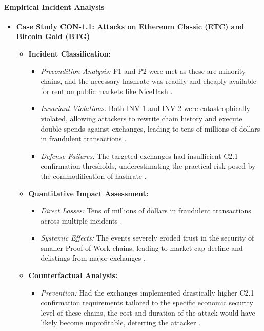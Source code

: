 \paragraph{Empirical Incident Analysis}

\begin{itemize}
    \item \textbf{Case Study CON-1.1: Attacks on Ethereum Classic (ETC) and Bitcoin Gold (BTG)}
    \begin{itemize}
        \item \textbf{Incident Classification:}
            \begin{itemize}
                \item \textit{Precondition Analysis:} P1 and P2 were met as these are minority chains, and the necessary hashrate was readily and cheaply available for rent on public markets like NiceHash \cite{Casino2019, Eyal2014}.
                \item \textit{Invariant Violations:} Both INV-1 and INV-2 were catastrophically violated, allowing attackers to rewrite chain history and execute double-spends against exchanges, leading to tens of millions of dollars in fraudulent transactions \cite{Casino2019}.
                \item \textit{Defense Failures:} The targeted exchanges had insufficient C2.1 confirmation thresholds, underestimating the practical risk posed by the commodification of hashrate \cite{Eyal2014}.
            \end{itemize}
        \item \textbf{Quantitative Impact Assessment:}
            \begin{itemize}
                \item \textit{Direct Losses:} Tens of millions of dollars in fraudulent transactions across multiple incidents \cite{Casino2019}.
                \item \textit{Systemic Effects:} The events severely eroded trust in the security of smaller Proof-of-Work chains, leading to market cap decline and delistings from major exchanges \cite{Casino2019, Wang2019}.
            \end{itemize}
        \item \textbf{Counterfactual Analysis:}
            \begin{itemize}
                \item \textit{Prevention:} Had the exchanges implemented drastically higher C2.1 confirmation requirements tailored to the specific economic security level of these chains, the cost and duration of the attack would have likely become unprofitable, deterring the attacker \cite{Eyal2014}.
            \end{itemize}
    \end{itemize}
\end{itemize}

